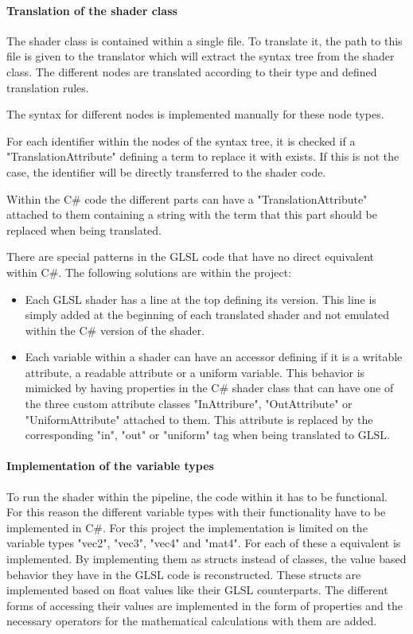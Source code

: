 \paragraph{Translation of the shader class}

The shader class is contained within a single file. To translate it, the path to this file is given to the translator which will extract the syntax tree from the shader class. The different nodes are translated according to their type and defined translation rules.

The syntax for different nodes is implemented manually for these node types.

For each identifier within the nodes of the syntax tree, it is checked if a "TranslationAttribute" defining a term to replace it with exists. If this is not the case, the identifier will be directly transferred to the shader code.

Within the C\# code the different parts can have a "TranslationAttribute" attached to them containing a string with the term that this part should be replaced when being translated.

There are special patterns in the GLSL code that have no direct equivalent within C\#. The following solutions are within the project:
\begin{itemize}
\item Each GLSL shader has a line at the top defining its version. This line is simply added at the beginning of each translated shader and not emulated within the C\# version of the shader.
\item Each variable within a shader can have an accessor defining if it is a writable attribute, a readable attribute or a uniform variable. This behavior is mimicked by having properties in the C\# shader class that can have one of the three custom attribute classes "InAttribure", "OutAttribute" or "UniformAttribute" attached to them. This attribute is replaced by the corresponding "in", "out" or "uniform" tag when being translated to GLSL.
\end{itemize}

\paragraph{Implementation of the variable types}

To run the shader within the pipeline, the code within it has to be functional. For this reason the different variable types with their functionality have to be implemented in C\#. For this project the implementation is limited on the variable types "vec2", "vec3", "vec4" and "mat4". For each of these a equivalent is implemented. By implementing them as structs instead of classes, the value based behavior they have in the GLSL code is reconstructed. These structs are implemented based on float values like their GLSL counterparts. The different forms of accessing their values are implemented in the form of properties and the necessary operators for the mathematical calculations with them are added.


